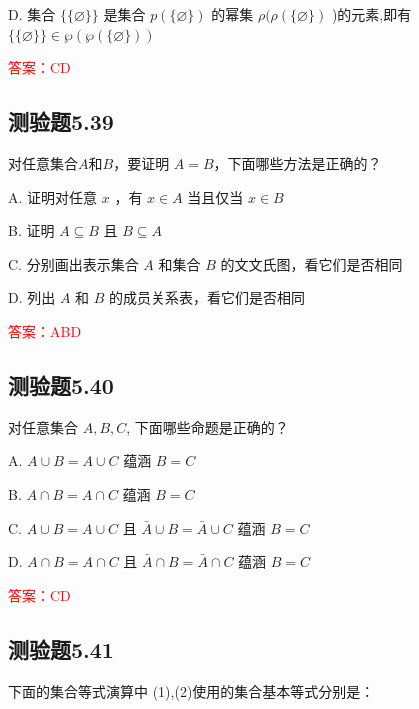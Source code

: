\documentclass[UTF8, heading=true]{ctexart}
\begin{document}
D. 
集合 $\{\{\varnothing\}\}$ 是集合 $p(\{\varnothing\})$ 的幂集 $\rho(\rho(\{\varnothing\})$ )的元素,即有 $\{\{\varnothing\}\} \in \wp(\wp(\{\varnothing\}))$

\textcolor{red}{答案：CD}

\subsection{测验题5.39}

对任意集合$A$和$B$，要证明
$A=B$，下面哪些方法是正确的？

A. 证明对任意 $x$ ，有 $x \in A$ 当且仅当 $x \in B$

B. 证明 $A \subseteq B$ 且 $B \subseteq A$

C. 分别画出表示集合 $A$ 和集合 $B$ 的文文氏图，看它们是否相同

D. 列出 $A$ 和 $B$ 的成员关系表，看它们是否相同

\textcolor{red}{答案：ABD}

\subsection{测验题5.40}
对任意集合 $A, B, C$, 下面哪些命题是正确的？

A. $ A \cup B=A \cup C$ 蕴涵 $B=C$

B. $A \cap B=A \cap C$ 蕴涵 $B=C$

C. $A \cup B=A \cup C$ 且 $\bar{A} \cup B=\bar{A} \cup C$ 蕴涵 $B=C$

D. $A \cap B=A \cap C$ 且 $\bar{A} \cap B=\bar{A} \cap C$ 蕴涵 $B=C$

\textcolor{red}{答案：CD}


\subsection{测验题5.41}
下面的集合等式演算中 (1),(2)使用的集合基本等式分别是：
\end{document}
